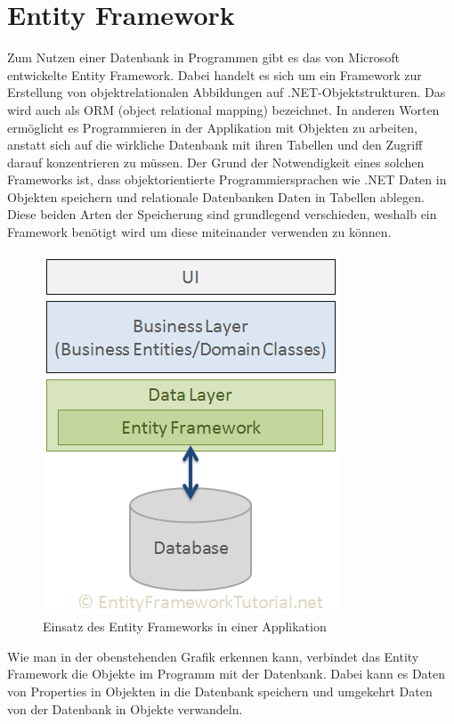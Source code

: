 \section{Entity Framework}
Zum Nutzen einer Datenbank in Programmen gibt es das von Microsoft entwickelte Entity Framework. Dabei handelt es sich um ein Framework zur Erstellung von objektrelationalen Abbildungen auf .NET-Objektstrukturen. Das wird auch als ORM (object relational mapping) bezeichnet. In anderen Worten ermöglicht es Programmieren in der Applikation mit Objekten zu arbeiten, anstatt sich auf die wirkliche Datenbank mit ihren Tabellen und den Zugriff darauf konzentrieren zu müssen. Der Grund der Notwendigkeit eines solchen Frameworks ist, dass objektorientierte Programmiersprachen wie .NET Daten in Objekten speichern und relationale Datenbanken Daten in Tabellen ablegen. Diese beiden Arten der Speicherung sind grundlegend verschieden, weshalb ein Framework benötigt wird um diese miteinander verwenden zu können.
\begin{figure}[H]
\begin{center}
	\includegraphics[scale=.65]{images/ef.png}
\end{center}
	\caption{Einsatz des Entity Frameworks in einer Applikation}
	\label{fig:sample}
\end{figure}
\noindent Wie man in der obenstehenden Grafik erkennen kann, verbindet das Entity Framework die Objekte im Programm mit der Datenbank. Dabei kann es Daten von Properties in  Objekten in die Datenbank speichern und umgekehrt Daten von der Datenbank in Objekte verwandeln. \newline
